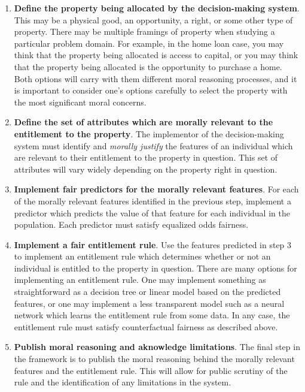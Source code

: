 \begin{enumerate}
    \item \textbf{Define the property being allocated by the decision-making
    system}. This may be a physical good, an opportunity, a right, or some other
    type of property. There may be multiple framings of property when studying a
    particular problem domain. For example, in the home loan case, you may think
    that the property being allocated is access to capital, or you may think
    that the property being allocated is the opportunity to purchase a home.
    Both options will carry with them different moral reasoning processes, and
    it is important to consider one's options carefully to select the property
    with the most significant moral concerns.
    \item \textbf{Define the set of attributes which are morally relevant to the
    entitlement to the property}. The implementor of the decision-making system
    must identify and \emph{morally justify} the features of an individual which
    are relevant to their entitlement to the property in question. This set of
    attributes will vary widely depending on the property right in question.
    \item \textbf{Implement fair predictors for the morally relevant features}.
    For each of the morally relevant features identified in the previous step,
    implement a predictor which predicts the value of that feature for each
    individual in the population. Each predictor must satisfy equalized odds
    fairness.
    \item \textbf{Implement a fair entitlement rule}. Use the features predicted
    in step 3 to implement an entitlement rule which determines whether or not
    an individual is entitled to the property in question. There are many
    options for implementing an entitlement rule. One may implement something as
    straightforward as a decision tree or linear model based on the predicted
    features, or one may implement a less transparent model such as a neural
    network which learns the entitlement rule from some data. In any case, the
    entitlement rule must satisfy counterfactual fairness as described above.
    \item \textbf{Publish moral reasoning and aknowledge limitations}. The
    final step in the framework is to publish the moral reasoning behind the
    morally relevant features and the entitlement rule. This will allow for
    public scrutiny of the rule and the identification of any limitations in the
    system.
\end{enumerate}

